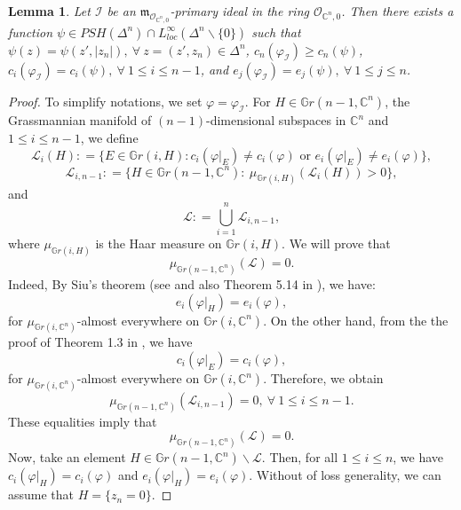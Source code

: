 \documentclass[a4paper,oneside,reqno,11pt]{article}
\newtheorem{lemma}[theorem]{Lemma}
\begin{document}
\begin{lemma}\label{toric_lemma}
Let $\mathcal I$ be an $\mathfrak{m}_{ \mathcal O_{ \mathbb C^n, 0} }$-primary ideal in the ring $\mathcal O_{ \mathbb C^n, 0 }$. Then there exists a function $\psi\in PSH ( \Delta^n )\cap L_{ loc }^{ \infty } ( \Delta^n\backslash \{ 0 \} )$ such that $\psi ( z ) = \psi ( z', | z_n | ),\ \forall\ z = ( z', z_n )\in \Delta^n$, $c_n ( \varphi_{\mathcal I } ) \geq c_n ( \psi )$, $c_i ( \varphi_{\mathcal I } ) = c_i ( \psi ),\ \forall\ 1\leq i\leq n-1$, and $e_j ( \varphi_{\mathcal I } ) = e_j ( \psi ),\ \forall\ 1\leq j\leq n$.
\end{lemma}
\begin{proof}
To simplify notations, we set $\varphi = \varphi_{ \mathcal I }$. For $H\in\mathbb { G }r ( n - 1, \mathbb C^n )$, the Grassmannian manifold of $(n-1)$-dimensional subspaces in $\mathbb C^n$ and $1\leq i\leq n-1$, we define
$$\mathcal { L }_i ( H ): = \{ E\in\mathbb { G }r ( i , H ): c_i ( \varphi |_{ E } ) \not = c_i ( \varphi ) \text{ or } e_i ( \varphi |_{ E } ) \not = e_i ( \varphi ) \},$$
$$\mathcal { L }_{ i, n- 1 }: = \{ H\in\mathbb { G }r ( n - 1, \mathbb C^n ): \ \mu_{ \mathbb { G }r (  i, H ) } ( \mathcal { L }_{ i } ( H ) ) > 0  \},$$
and 
$$\mathcal L: = \bigcup\limits_{ i = 1 }^n \mathcal { L }_{ i , n - 1 },$$
where $\mu_{ \mathbb { G }r ( i , H ) }$ is the Haar measure on $\mathbb { G }r ( i , H )$. We will prove that 
$$\mu_{ \mathbb { G }r ( n - 1, \mathbb C^n ) } ( \mathcal L ) = 0.$$
Indeed, By Siu's theorem (see \cite{Si74} and also Theorem 5.14 in \cite{De92}), we have:
$$e_i ( \varphi |_{ H } ) = e_i ( \varphi ),$$
for $\mu_{ \mathbb { G }r ( i , \mathbb C^n ) }$-almost everywhere on $\mathbb { G }r ( i, \mathbb C^n )$. On the other hand, from the the proof of Theorem 1.3 in \cite{Hi17}, we have
$$c_i ( \varphi |_{ E } ) = c_i ( \varphi ),$$
for $\mu_{ \mathbb { G }r ( i , \mathbb C^n ) }$-almost everywhere on $\mathbb { G }r ( i, \mathbb C^n )$. Therefore, we obtain
$$\mu_{ \mathbb { G }r ( n - 1, \mathbb C^n ) } ( \mathcal { L }_{ i, n - 1 } ) = 0,\ \forall\ 1\leq i\leq n - 1.$$ 
These equalities imply that
$$\mu_{ \mathbb { G }r ( n - 1, \mathbb C^n ) } ( \mathcal L ) = 0.$$
Now, take an element $H\in\mathbb { G }r ( n - 1, \mathbb C^n )\backslash \mathcal L$. Then, for all $1\leq i\leq n$, we have $c_i ( \varphi |_{ H } ) = c_i ( \varphi )$ and $e_i ( \varphi |_{ H } ) = e_i ( \varphi )$. Without of loss generality, we can assume that $H = \{ z_n = 0 \}$. 


\end{proof}
\end{document}
